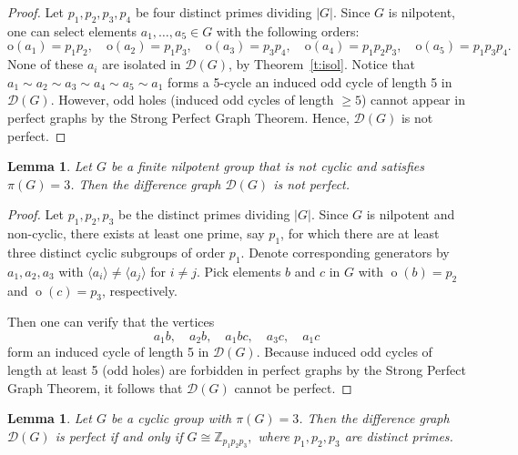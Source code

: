 \documentclass[12pt]{amsart}
\theoremstyle{plain}
\newtheorem{lemma}[theorem]{Lemma}
\theoremstyle{remark}
\theoremstyle{definition}
\begin{document}
\begin{proof}
Let \(p_1, p_2, p_3, p_4\) be four distinct primes dividing \(\lvert G \rvert\). Since \(G\) is nilpotent, one can select elements
$a_1, \dots, a_5 \in G$
with the following orders:
\[
\mathrm{o}(a_1) = p_1 p_2,\quad
\mathrm{o}(a_2) = p_1 p_3,\quad
\mathrm{o}(a_3) = p_3 p_4,\quad
\mathrm{o}(a_4) = p_1 p_2 p_3,\quad
\mathrm{o}(a_5) = p_1 p_3 p_4.
\]
None of these \(a_i\) are isolated in \(\mathcal{D}(G)\), by Theorem~\ref{t:isol}.  
Notice that
$a_1 \sim a_2 \sim a_3 \sim a_4 \sim a_5 \sim a_1$
forms a 5-cycle an induced odd cycle of length 5 in \(\mathcal{D}(G)\). However, odd holes (induced odd cycles of length \(\ge 5\)) cannot appear in perfect graphs by the Strong Perfect Graph Theorem. Hence, \(\mathcal{D}(G)\) is not perfect.
\end{proof}

\begin{lemma}\label{t:nilp_imperf2}
Let \(G\) be a finite nilpotent group that is not cyclic and satisfies \(\pi(G)= 3\). Then the difference graph \(\mathcal{D}(G)\) is not perfect.
\end{lemma}

\begin{proof}
Let \(p_1, p_2, p_3\) be the distinct primes dividing \(\lvert G\rvert\). Since \(G\) is nilpotent and non-cyclic, there exists at least one prime, say \(p_1\), for which there are at least three distinct cyclic subgroups of order \(p_1\). Denote corresponding generators by \(a_1, a_2, a_3\) with \(\langle a_i\rangle \neq \langle a_j\rangle\) for \(i\neq j\). Pick elements \(b\) and \(c\) in \(G\) with \(\operatorname{o}(b) = p_2\) and \(\operatorname{o}(c) = p_3\), respectively. 

Then one can verify that the vertices
\[
a_1 b,\quad
a_2 b,\quad
a_1 b c,\quad
a_3 c,\quad
a_1 c
\]
form an induced cycle of length 5 in \(\mathcal{D}(G)\). Because induced odd cycles of length at least 5 (odd holes) are forbidden in perfect graphs by the Strong Perfect Graph Theorem, it follows that \(\mathcal{D}(G)\) cannot be perfect.
\end{proof}



\begin{lemma}\label{t:cyc_perf}
Let \(G\) be a cyclic group with \(\pi(G) = 3\). Then the difference graph \(\mathcal{D}(G)\) is perfect if and only if
$G \cong \mathbb{Z}_{p_1 p_2 p_3},$
where \(p_1, p_2, p_3\) are distinct primes.
\end{lemma}
\end{document}
